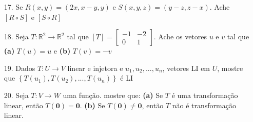 \begin{itemize}
	\item [17.] Se $R(x,y)=(2x,x-y,y)$ e $S(x,y,z)=(y-z,z-x)$. Ache $[R\circ S]$ e $[S \circ R]$ 
\end{itemize}
\begin{itemize}
	\item [18.] Seja $T:\mathbb{R}^{2}\longrightarrow \mathbb{R}^{2}$ tal que $[T]=\begin{bmatrix}
	-1     & -2  \\
	 0     & 1  
	\end{bmatrix}$. Ache os vetores $u$ e $v$ tal que \textbf{(a)} $T(u)=u$ e \textbf{(b)} $T(v)=-v$
\end{itemize}
\begin{itemize}
	\item [19.] Dados $T:U\longrightarrow V$ linear e injetora e $u_{1}, u_{2},..., u_{n}$, vetores LI em $U$, mostre que $\left\lbrace T(u_{1}), T(u_{2}),...,T(u_{n}) \right\rbrace $ é LI
\end{itemize}
\begin{itemize}
	\item [20.] Seja $T:V\longrightarrow W$ uma função. mostre que: \textbf{(a)} Se $T$ é uma transformação linear, então $T(\textbf{0})=\textbf{0}$. \textbf{(b)} Se $T(\textbf{0})\neq \textbf{0}$, então $T$ não é transformação linear.
\end{itemize}


